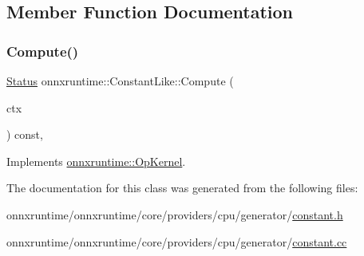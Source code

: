 \subsection{Member Function Documentation}
\mbox{\label{classonnxruntime_1_1ConstantLike_ac6d5310ffc7f9603f4c988bb4ff6dfd2}} 
\subsubsection{\texorpdfstring{Compute()}{Compute()}}
{\footnotesize\ttfamily \mbox{\hyperlink{classonnxruntime_1_1common_1_1Status}{Status}} onnxruntime\+::\+Constant\+Like\+::\+Compute (\begin{DoxyParamCaption}\item[{\mbox{\hyperlink{classonnxruntime_1_1OpKernelContext}{Op\+Kernel\+Context}} $\ast$}]{ctx }\end{DoxyParamCaption}) const\hspace{0.3cm}{\ttfamily [override]}, {\ttfamily [virtual]}}



Implements \mbox{\hyperlink{classonnxruntime_1_1OpKernel_a9eca8656a78b1b3ab9d3351a12798650}{onnxruntime\+::\+Op\+Kernel}}.



The documentation for this class was generated from the following files\+:\begin{DoxyCompactItemize}
\item 
onnxruntime/onnxruntime/core/providers/cpu/generator/\mbox{\hyperlink{constant_8h}{constant.\+h}}\item 
onnxruntime/onnxruntime/core/providers/cpu/generator/\mbox{\hyperlink{constant_8cc}{constant.\+cc}}\end{DoxyCompactItemize}
